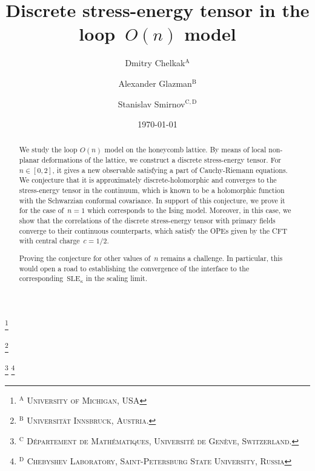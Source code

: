 \documentclass[reqno,11pt,a4paper]{amsart}
\theoremstyle{remark}
\begin{document}
\title{Discrete stress-energy tensor in the loop~$O(n)$ model}
\date{\today}

\author[Dmitry Chelkak]{Dmitry Chelkak$^\mathrm{A}$}
\author[Alexander Glazman]
{Alexander Glazman$^\mathrm{B}$}
\author[Stanislav Smirnov]
{Stanislav Smirnov$^\mathrm{C,D}$}

\thanks{\textsc{${}^\mathrm{A}$ University of Michigan, USA}}

\thanks{\textsc{${}^\mathrm{B}$ Universität Innsbruck, Austria.}}

\thanks{\textsc{${}^\mathrm{C}$
D\'epartement de Math\'ematiques, Universit\'e de Gen\`eve, Switzerland.}}
\thanks{\textsc{${}^\mathrm{D}$ Chebyshev Laboratory, Saint-Petersburg State University, Russia}}




\begin{abstract}
We study the loop $O(n)$ model on the honeycomb lattice. By means of local non-planar deformations of the lattice, we construct a discrete stress-energy tensor. 
For $n\in [0,2]$, it gives a new observable satisfying a part of Cauchy-Riemann equations. We conjecture that it is approximately discrete-holomorphic and converges to the stress-energy tensor in the continuum, which is known to be a holomorphic function with the Schwarzian conformal covariance. 
In support of this conjecture, we prove it for the case of~$n=1$ which corresponds to the Ising model. Moreover, in this case, we show that the correlations of the discrete stress-energy tensor with primary fields converge to their continuous counterparts, which satisfy the OPEs given by the CFT with central charge~$c=1/2$.

Proving the conjecture for other values of~$n$ remains a challenge. In particular, this would open a road to establishing the convergence of the interface to the corresponding~$\mathrm{SLE}_\kappa$ in the scaling limit. 
\end{abstract}

\maketitle

\tableofcontents
\end{document}
